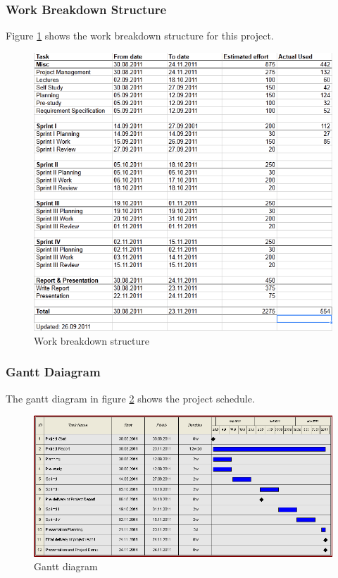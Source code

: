 \subsubsection{Work Breakdown Structure}
Figure \ref{fig:wbs} shows the work breakdown structure for this project.
\begin{figure}[here]
\includegraphics[scale=0.80]{./planning/img/wbs.png}
\caption{Work breakdown structure}
\label{fig:wbs}
\end{figure}

\subsubsection{Gantt Daiagram}
The gantt diagram in figure \ref{fig:gantt} shows the project schedule.
\begin{figure}[here]
\includegraphics[scale=0.48]{./planning/img/gantt.png}
\caption{Gantt diagram}
\label{fig:gantt}
\end{figure}

